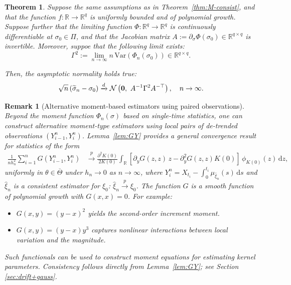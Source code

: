 \documentclass[a4paper,10pt,twoside]{article}
\newtheorem{thm}{Theorem}[section]
\newtheorem{remark}{Remark}[section]
\numberwithin{equation}{section}
\def\R{\mathbb{R}}
\def\l{\left}
\def\r{\right}
\def\th{\theta}
\def\p{\partial}
\def\toP{\stackrel{p}{\longrightarrow}}
\def\mb#1{\mbox{\boldmath $#1$}}
\def\wh#1{\widehat{#1}}
\def\ol#1{\overline{#1}}
\def\wt#1{\widetilde{#1}}
\def\df{\mathrm{d}}
\begin{document}
\begin{thm}\label{thm:M-asy-norm}
Suppose the same assumptions as in Theorem~\ref{thm:M-consist}, and that the function $f : \mathbb{R} \to \mathbb{R}^q$ is uniformly bounded and of polynomial growth.
Suppose further that the limiting function $\Phi : \mathbb{R}^q \to \mathbb{R}^q$ is continuously differentiable at $\sigma_0 \in \Pi$, 
and that the Jacobian matrix $A := \p_\sigma \Phi(\sigma_0) \in \mathbb{R}^{q \times q}$ is invertible.
Moreover, suppoe that the following limit exists:
\[
\Gamma^2 := \lim_{n \to \infty} n\, \mathrm{Var}\l( \Phi_n(\sigma_0) \r) \in \mathbb{R}^{q \times q}.
\]

Then, the asymptotic normality holds true:
\[
\sqrt{n} \l( \wt{\sigma}_n - \sigma_0 \r) 
\xrightarrow{d} \mathcal{N} \l( \mb{0},\ A^{-1} \Gamma^2 A^{-\top} \r), \quad n \to \infty. 
\]
\end{thm}

\begin{remark}[Alternative moment-based estimators using paired observations]
Beyond the moment function $\Phi_n(\sigma)$ based on single-time statistics, one can construct alternative moment-type estimators using local pairs of de-trended observations $(Y_{i-1}^n, Y_i^n)$. Lemma~\ref{lem:GY} provides a general convergence result for statistics of the form
\begin{align*}
\frac{1}{n h_n^2} \sum_{i=1}^n G(Y^n_{i-1}, Y^n_i)&\toP  \frac{\p^2 K(0)}{2 K(0)}  \int_\R \l[\p_y G(z,z)\,z - \p_y^2 G(z, z)K(0)\r] \, \phi_{K(0)}(z)\,\df z,
\end{align*}
uniformly in $\th \in \ol{\Theta}$ under $h_n\to 0$ as $n\to \infty$, where $Y_i^n= X_{t_i} - \int_0^{t_i} \mu_{\wh{\xi}_n}(s)\,\df s$ and 
$\wh{\xi}_n$ is a consistent estimator for $\xi_0$: $\wh{\xi}_n\toP \xi_0$. 
The function $G$ is a smooth function of polynomial growth with $G(x,x)=0$. For example:
\begin{itemize}
  \item $G(x,y) = (y - x)^2$ yields the second-order increment moment. 
  \item $G(x,y) = (y - x) y^3$ captures nonlinear interactions between local variation and the magnitude. 
\end{itemize}
Such functionals can be used to construct moment equations for estimating kernel parameters. Consistency follows directly from Lemma~\ref{lem:GY}; see Section \ref{sec:drift+gauss}. 
\end{remark}
\end{document}
